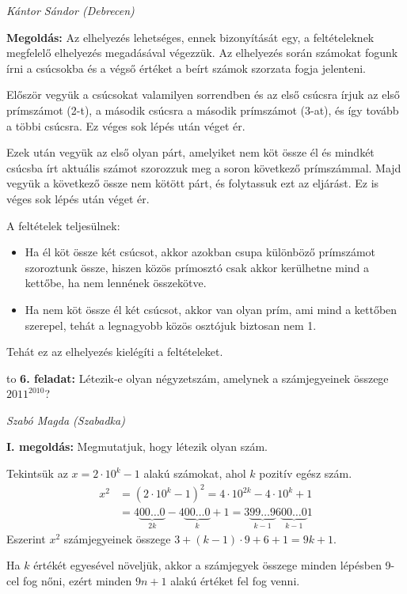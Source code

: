 \documentclass[a4paper,10pt]{article}
\newcommand{\ki}[2]{\hfill {\it #1 (#2)}\medskip}
\newcommand{\vonal}{\hbox to \hsize{\hskip2truecm\hrulefill\hskip2truecm}}
\begin{document}
\ki{Kántor Sándor}{Debrecen}\medskip

{\bf Megoldás: } Az elhelyezés lehetséges, ennek bizonyítását egy, a feltételeknek megfelelő elhelyezés megadásával végezzük. Az elhelyezés során számokat fogunk írni a csúcsokba és a végső értéket a beírt számok szorzata fogja jelenteni.

Először vegyük a csúcsokat valamilyen sorrendben és az első csúcsra írjuk az első prímszámot (2-t), a második csúcsra a második prímszámot (3-at), és így tovább a többi csúcsra. Ez véges sok lépés után véget ér.

Ezek után vegyük az első olyan párt, amelyiket nem köt össze él és mindkét csúcsba írt aktuális számot szorozzuk meg a soron következő prímszámmal. Majd vegyük a következő össze nem kötött párt, és folytassuk ezt az eljárást. Ez is véges sok lépés után véget ér.

A feltételek teljesülnek:
\begin{itemize}
\item Ha él köt össze két csúcsot, akkor azokban csupa különböző prímszámot szoroztunk össze, hiszen közös prímosztó csak akkor kerülhetne mind a kettőbe, ha nem lennének összekötve.
\item Ha nem köt össze él két csúcsot, akkor van olyan prím, ami mind a kettőben szerepel, tehát a legnagyobb közös osztójuk biztosan nem 1.
\end{itemize}

Tehát ez az elhelyezés kielégíti a feltételeket.
\medskip

\vonal
{\bf 6. feladat: } 
Létezik-e olyan négyzetszám, amelynek a számjegyeinek összege  $2011^{2010}$?

\ki{Szabó Magda}{Szabadka}

{\bf I. megoldás: } Megmutatjuk, hogy létezik olyan szám.

Tekintsük az $x=2\cdot10^k-1$ alakú számokat, ahol $k$ pozitív egész szám.
\begin{align*}
x^2&=\left(2\cdot10^k-1\right)^2=4\cdot10^{2k}-4\cdot10^k+1\\
&=4\underbrace{00\ldots0}_{2k}-4\underbrace{00\ldots0}_{k}+1=3\underbrace{99\ldots9}_{k-1}6\underbrace{00\ldots0}_{k-1}1
\end{align*}
Eszerint $x^2$ számjegyeinek összege $3+(k-1)\cdot9+6+1=9k+1$.

Ha $k$ értékét egyesével növeljük, akkor a számjegyek összege minden lépésben 9-cel fog nőni, ezért minden $9n+1$ alakú értéket fel fog venni.
\end{document}
